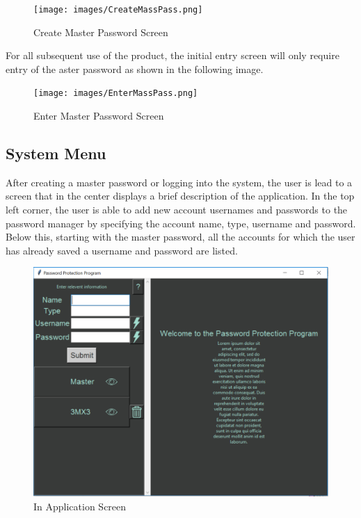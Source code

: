 \documentclass[12pt, titlepage]{article}
\begin{document}
\begin{figure}[h]
	\texttt{[image: images/CreateMassPass.png]}
	\caption{Create Master Password Screen}
	\label{fig:crMasPass}
\end{figure}

For all subsequent use of the product, the initial entry screen will only require entry of the aster password as shown in the following image.

\begin{figure}[h]
	\texttt{[image: images/EnterMassPass.png]}
	\caption{Enter Master Password Screen}
	\label{fig:enMasPass}
\end{figure}


\subsection{System Menu} \label{SysMenu}

After creating a master password or logging into the system, the user is lead to a screen that in the center displays a brief description of the application. In the top left corner, the user is able to add new account usernames and passwords to the password manager by specifying the account name, type, username and password. Below this, starting with the master password, all the accounts for which the user has already saved a username and password are listed. 


\begin{figure}[h]
	\includegraphics[scale=0.3]{images/InAppScreen.png}
	\caption{In Application Screen}
	\label{fig:InApp}
\end{figure}
\end{document}
